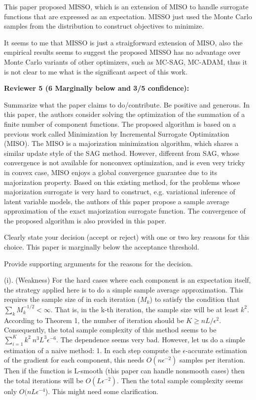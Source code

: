 \documentclass{article}
\begin{document}
This paper proposed MISSO, which is an extension of MISO to handle surrogate functions that are expressed as an expectation. MISSO just used the Monte Carlo samples from the distribution to construct objectives to minimize.

It seems to me that MISSO is just a straigforward extension of MISO, also the empirical results seems to suggest the proposed MISSO has no advantage over Monte Carlo variants of other optimizers, such as MC-SAG, MC-ADAM, thus it is not clear to me what is the significant aspect of this work.



\textbf{Reviewer 5 (6 Marginally below and 3/5 confidence):}

Summarize what the paper claims to do/contribute. Be positive and generous.
In this paper, the authors consider solving the optimization of the summation of a finite number of component functions. The proposed algorithm is based on a previous work called Minimization by Incremental Surrogate Optimization (MISO). The MISO is a majorization minimization algorithm, which shares a similar update style of the SAG method. However, different from SAG, whose convergence is not available for nonconvex optimization, and is even very tricky in convex case, MISO enjoys a global convergence guarantee due to its majorization property. Based on this existing method, for the problems whose majorization surrogate is very hard to construct, e.g. variational inference of latent variable models, the authors of this paper propose a sample average approximation of the exact majorization surrogate function. The convergence of the proposed algorithm is also provided in this paper.

Clearly state your decision (accept or reject) with one or two key reasons for this choice. This paper is marginally below the acceptance threshold.

Provide supporting arguments for the reasons for the decision.

(i). (Weakness) For the hard cases where each component is an expectation itself, the strategy applied here is to do a simple sample average approximation. This requires the sample size of in each iteration ($M_k$) to satisfy the condition that $\sum_k M_k^{-1/2}<\infty$. That is, in the k-th iteration, the sample size will be at least $k^2$. According to Theorem 1, the number of iteration should be $K\geq nL/\epsilon^2$. Consequently, the total sample complexity of this method seems to be $\sum_{i=1}^{K} k^2 ~ n^3L^3\epsilon^{-6}$. The 
 dependence seems very bad. However, let us do a simple estimation of a naive method: 1. In each step compute the $\epsilon$-accurate estimation of the gradient for each component, this needs $O(n \epsilon^{-2})$ samples per iteration. Then if the function is L-smooth (this paper can handle nonsmooth cases) then the total iterations will be $O(L\epsilon^{-2})$. Then the total sample complexity seems only $O(nL\epsilon^{-4}$). This might need some clarification.
\end{document}

